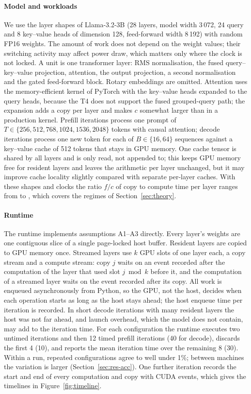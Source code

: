 \paragraph{Model and workloads}
We use the layer shapes of Llama-3.2-3B \cite{dubey2024llama3} (28 layers, model width 3\,072, 24 query and 8 key--value heads of dimension 128, feed-forward width 8\,192) with random FP16 weights. The amount of work does not depend on the weight values; their switching activity may affect power draw, which matters only where the clock is not locked. A unit is one transformer layer: RMS normalisation, the fused query--key--value projection, attention, the output projection, a second normalisation and the gated feed-forward block. Rotary embeddings are omitted. Attention uses the memory-efficient kernel of PyTorch with the key--value heads expanded to the query heads, because the T4 does not support the fused grouped-query path; the expansion adds a copy per layer and makes $c$ somewhat larger than in a production kernel. Prefill iterations process one prompt of $T\in\{256,512,768,1024,1536,2048\}$ tokens with causal attention; decode iterations process one new token for each of $B\in\{16,64\}$ sequences against a key--value cache of 512 tokens that stays in GPU memory. One cache tensor is shared by all layers and is only read, not appended to; this keeps GPU memory free for resident layers and leaves the arithmetic per layer unchanged, but it may improve cache locality slightly compared with separate per-layer caches. With these shapes and clocks the ratio $f/c$ of copy to compute time per layer ranges from \nRatioMin{} to \nRatioMax, which covers the regimes of Section~\ref{sec:theory}.

\paragraph{Runtime}
The runtime implements assumptions A1--A3 directly. Every layer's weights are one contiguous slice of a single page-locked host buffer. Resident layers are copied to GPU memory once. Streamed layers use $k$ GPU slots of one layer each, a copy stream and a compute stream: copy $j$ waits on an event recorded after the computation of the layer that used slot $j \bmod k$ before it, and the computation of a streamed layer waits on the event recorded after its copy. All work is enqueued asynchronously from Python, so the GPU, not the host, decides when each operation starts as long as the host stays ahead; the host enqueue time per iteration is recorded. In short decode iterations with many resident layers the host was not far ahead, and launch overhead, which the model does not contain, may add to the iteration time. For each configuration the runtime executes two untimed iterations and then 12 timed prefill iterations (40 for decode), discards the first 4 (10), and reports the mean iteration time over the remaining 8 (30). Within a run, repeated configurations agree to well under 1\%; between machines the variation is larger (Section~\ref{sec:res-acc}). One further iteration records the start and end of every computation and copy with CUDA events, which gives the timelines in Figure~\ref{fig:timeline}.

